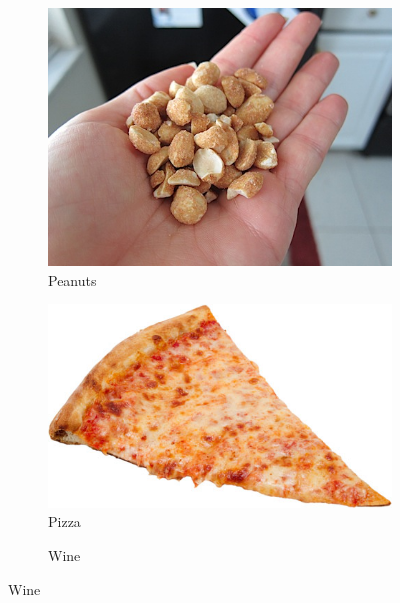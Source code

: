 \documentclass[a4paper,doc,natbib]{apa6}
\begin{document}
\begin{figure}[h!]
\begin{subfigure}[b]{0.32\textwidth}
 \end{subfigure} 
   \begin{subfigure}[b]{0.32\textwidth}
 \caption{Peanuts}
\includegraphics[width=0.95\linewidth]{Images/peanuts.jpg}
 \end{subfigure}
\begin{subfigure}[b]{0.32\textwidth}
 \caption{Pizza}
\includegraphics[width=0.95\linewidth]{Images/pizza.jpg}
 \end{subfigure}
 \begin{subfigure}[b]{0.28\textwidth}
 \caption{Wine}

\end{subfigure}
\end{figure}
\end{document}
